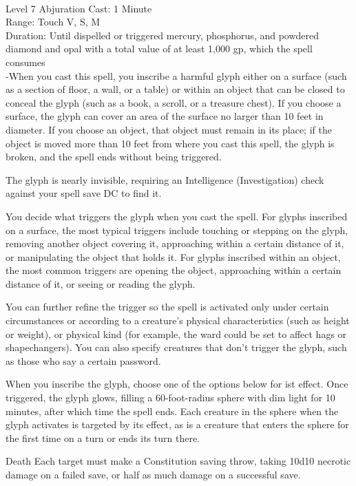 \documentclass[10pt,twocolumn]{report}
\begin{document}
 \\
Level 7 \quad Abjuration \quad Cast: 1 Minute\\
Range: Touch \quad V, S, M\\
Duration: Until dispelled or triggered \quad mercury, phosphorus, and powdered diamond and opal with a total value of at least 1,000 gp, which the spell consumes\\
-When you cast this spell, you inscribe a harmful glyph either on a surface (such as a section of floor, a wall, or a table) or within an object that can be closed to conceal the glyph (such as a book, a scroll, or a treasure chest).
If you choose a surface, the glyph can cover an area of the surface no larger than 10 feet in diameter. If you choose an object, that object must remain in its place; if the object is moved more than 10 feet from where you cast this spell, the glyph is broken, and the spell ends without being triggered.

The glyph is nearly invisible, requiring an Intelligence (Investigation) check against your spell save DC to find it.

You decide what triggers the glyph when you cast the spell. For glyphs inscribed on a surface, the most typical triggers include touching or stepping on the glyph, removing another object covering it, approaching within a certain distance of it, or manipulating the object that holds it. For glyphs inscribed within an object, the most common triggers are opening the object, approaching within a certain distance of it, or seeing or reading the glyph.

You can further refine the trigger so the spell is activated only under certain circumstances or according to a creature's physical characteristics (such as height or weight), or physical kind (for example, the ward could be set to affect hags or shapechangers). You can also specify creatures that don't trigger the glyph, such as those who say a certain password.

When you inscribe the glyph, choose one of the options below for ist effect. Once triggered, the glyph glows, filling a 60-foot-radius sphere with dim light for 10 minutes, after which time the spell ends. Each creature in the sphere when the glyph activates is targeted by its effect, as is a creature that enters the sphere for the first time on a turn or ends its turn there.

Death
Each target must make a Constitution saving throw, taking 10d10 necrotic damage on a failed save, or half as much damage on a successful save.
\end{document}
